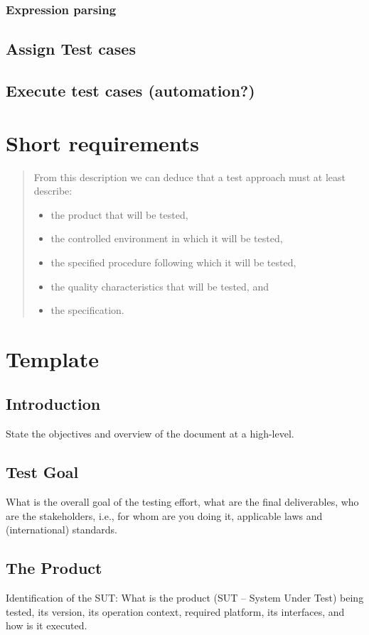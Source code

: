 \documentclass[11pt,a4paper]{article}
\begin{document}
\subsubsection{Expression parsing}
\label{sec:orgheadline12}
\subsection{Assign Test cases}
\label{sec:orgheadline14}
\subsection{Execute test cases (automation?)}
\label{sec:orgheadline15}
\section{Short requirements}
\label{sec:orgheadline17}
\begin{quote}
From this description we can deduce that a test approach must at least describe:
\begin{itemize}
\item the product that will be tested,
\item the controlled environment in which it will be tested,
\item the specified procedure following which it will be tested,
\item the quality characteristics that will be tested, and
\item the specification.
\end{itemize}
\end{quote}

\section{Template}
\label{sec:orgheadline32}
\subsection{Introduction}
\label{sec:orgheadline18}
State the objectives and overview of the document at a high-level.
\subsection{Test Goal}
\label{sec:orgheadline19}
What is the overall goal of the testing effort, what are the final deliverables, who are the
stakeholders, i.e., for whom are you doing it, applicable laws and (international) standards.
\subsection{The Product}
\label{sec:orgheadline20}
Identification of the SUT: What is the product (SUT – System Under Test) being tested, its
version, its operation context, required platform, its interfaces, and how is it executed.
\end{document}
